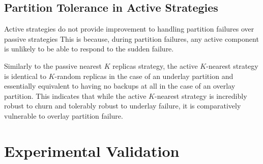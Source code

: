 

\subsection{Partition Tolerance in Active Strategies}
Active strategies do not provide improvement to handling partition failures over passive strategies
This is because, during partition failures, any active component is unlikely to be able to respond to the sudden failure.

Similarly to the passive nearest $K$ replicas strategy, the active $K$-nearest strategy is identical to $K$-random replicas in the case of an underlay partition and essentially equivalent to having no backups at all in the case of an overlay partition.
This indicates that while the active $K$-nearest strategy is incredibly robust to churn and tolerably robust to underlay failure, it is comparatively vulnerable to overlay partition failure.


\section{Experimental Validation}

